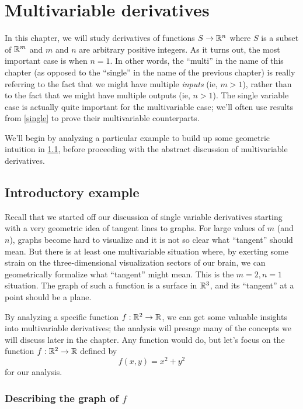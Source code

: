 \chapter{Multivariable derivatives} \label{multi}

In this chapter, we will study derivatives of functions $S \to \mathbb{R}^n$ where $S$ is a subset of $\mathbb{R}^m$ and $m$ and $n$ are arbitrary positive integers. As it turns out, the most important case is when $n = 1$. In other words, the ``multi'' in the name of this chapter (as opposed to the ``single'' in the name of the previous chapter) is really referring to the fact that we might have multiple \emph{inputs} (ie, $m > 1$), rather than to the fact that we might have multiple outputs (ie, $n > 1$). The single variable case is actually quite important for the multivariable case; we'll often use results from \cref{single} to prove their multivariable counterparts. 

We'll begin by analyzing a particular example to build up some geometric intuition in \cref{multi-introductory-example}, before proceeding with the abstract discussion of multivariable derivatives. 

\section{Introductory example} \label{multi-introductory-example}

Recall that we started off our discussion of single variable derivatives starting with a very geometric idea of tangent lines to graphs. For large values of $m$ (and $n$), graphs become hard to visualize and it is not so clear what ``tangent'' should mean. But there is at least one multivariable situation where, by exerting some strain on the three-dimensional visualization sectors of our brain, we can geometrically formalize what ``tangent'' might mean. This is the $m = 2, n = 1$ situation. The graph of such a function is a surface in $\mathbb{R}^3$, and its ``tangent'' at a point should be a plane. 

By analyzing a specific function $f : \mathbb{R}^2 \to \mathbb{R}$,  we can get some valuable insights into multivariable derivatives; the analysis will presage many of the concepts we will discuss later in the chapter. Any function would do, but let's focus on the function $f : \mathbb{R}^2 \to \mathbb{R}$ defined by
\[ f(x, y) = x^2 + y^2 \]
for our analysis.  

\subsection*{Describing the graph of \texorpdfstring{$f$}{f}}


